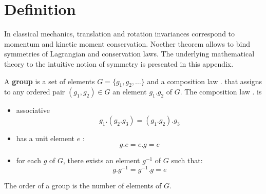 \documentclass[12pt]{book}
\begin{document}
\section{Definition}
In classical mechanics, translation and rotation invariances
correspond to momentum and kinetic moment conservation. Noether theorem allows
to bind symmetries of Lagrangian and conservation laws.
The underlying mathematical theory to the intuitive notion of symmetry is
presented in this appendix.
\begin{defn}
A {\bf group} is a set of elements $G=\{g_1,g_2,\dots\}$ and a composition law
$.$ that assigns to any ordered pair $(g_1,g_2)\in G$ an element $g_1.g_2$ of
$G$. The composition law $.$ is 
\begin{itemize}
\item associative
\begin{equation}
g_1.(g_2.g_3)=(g_1.g_2).g_3
\end{equation}
\item has a unit element $e$ :
\begin{equation}
g.e=e.g=e
\end{equation}
\item for each $g$ of $G$, there exists an element $g^{-1}$ of
$G$ such that:
\begin{equation}
g.g^{-1}=g^{-1}.g=e
\end{equation}
\end{itemize}
\end{defn}
\begin{defn}
The order of a group is the number of elements of $G$.
\end{defn}
\end{document}
